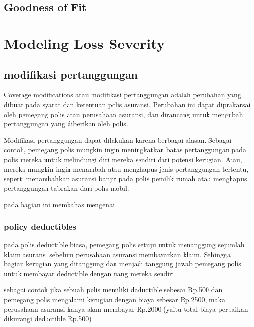 \documentclass[
]{book}
\begin{document}
\hypertarget{goodness-of-fit}{%
\section{Goodness of Fit}\label{goodness-of-fit}}

\hypertarget{modeling-loss-severity}{%
\chapter{Modeling Loss Severity}\label{modeling-loss-severity}}

\hypertarget{modifikasi-pertanggungan}{%
\section{modifikasi pertanggungan}\label{modifikasi-pertanggungan}}

Coverage modifications atau modifikasi pertanggungan adalah perubahan yang dibuat pada syarat dan ketentuan polis asuransi. Perubahan ini dapat diprakarsai oleh pemegang polis atau perusahaan asuransi, dan dirancang untuk mengubah pertanggungan yang diberikan oleh polis.

Modifikasi pertanggungan dapat dilakukan karena berbagai alasan. Sebagai contoh, pemegang polis mungkin ingin meningkatkan batas pertanggungan pada polis mereka untuk melindungi diri mereka sendiri dari potensi kerugian. Atau, mereka mungkin ingin menambah atau menghapus jenis pertanggungan tertentu, seperti menambahkan asuransi banjir pada polis pemilik rumah atau menghapus pertanggungan tabrakan dari polis mobil.

pada bagian ini membahas mengenai

\hypertarget{policy-deductibles}{%
\subsection{policy deductibles}\label{policy-deductibles}}

pada polis deductible biasa, pemegang polis setuju untuk menanggung sejumlah klaim asuransi sebelum perusahaan asuransi membayarkan klaim. Sehingga bagian kerugian yang ditanggung dan menjadi tanggung jawab pemegang polis untuk membayar deductible dengan uang mereka sendiri.

sebagai contoh jika sebuah polis memiliki daductible sebesar Rp.500 dan pemegang polis mengalami kerugian dengan biaya sebesar Rp.2500, maka perusahaan asuransi hanya akan membayar Rp.2000 (yaitu total biaya perbaikan dikurangi deductible Rp.500)
\end{document}
